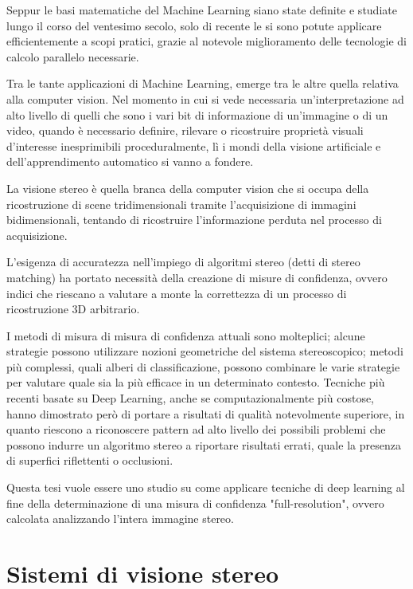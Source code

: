 \documentclass[12pt,a4paper]{report}
\begin{document}
Seppur le basi matematiche del Machine Learning siano state definite e studiate
lungo il corso del ventesimo secolo, solo di recente
\cite{krizhevsky2012imagenet} le si sono potute applicare efficientemente a
scopi pratici, grazie al notevole miglioramento delle tecnologie di calcolo
parallelo necessarie.

Tra le tante applicazioni di Machine Learning, emerge tra le altre quella
relativa alla computer vision.  Nel momento in cui si vede necessaria
un'interpretazione ad alto livello di quelli che sono i vari bit di
informazione di un'immagine o di un video, quando è necessario definire,
rilevare o ricostruire proprietà visuali d'interesse inesprimibili
proceduralmente, lì i mondi della visione artificiale e dell'apprendimento
automatico si vanno a fondere.

La visione stereo è quella branca della computer vision che si occupa della
ricostruzione di scene tridimensionali tramite l'acquisizione di immagini
bidimensionali, tentando di ricostruire l'informazione perduta nel processo di
acquisizione. 

L'esigenza di accuratezza nell'impiego di algoritmi stereo (detti di stereo
matching) ha portato necessità della creazione di misure di confidenza, ovvero
indici che riescano a valutare a monte la correttezza di un processo di
ricostruzione 3D arbitrario.

I metodi di misura di misura di confidenza attuali sono molteplici; alcune
strategie possono utilizzare nozioni geometriche del sistema stereoscopico;
metodi più complessi, quali alberi di classificazione, possono combinare le
varie strategie per valutare quale sia la più efficace in un determinato
contesto.  Tecniche più recenti basate su Deep Learning, anche se
computazionalmente più costose, hanno dimostrato però di portare a risultati di
qualità notevolmente superiore, in quanto riescono a riconoscere pattern ad
alto livello dei possibili problemi che possono indurre un algoritmo stereo a
riportare risultati errati, quale la presenza di superfici riflettenti o
occlusioni.

Questa tesi vuole essere uno studio su come applicare tecniche di deep learning
al fine della determinazione di una misura di confidenza "full-resolution",
ovvero calcolata analizzando l'intera immagine stereo.

\chapter{Sistemi di visione stereo}
\end{document}
